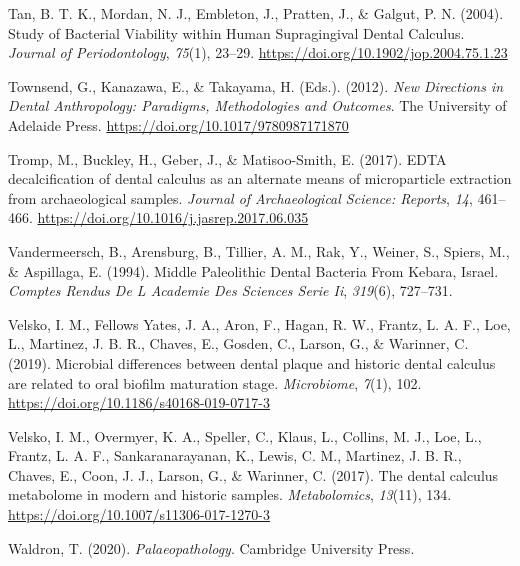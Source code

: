 \documentclass[
  b5paper,
]{book}
\newlength{\cslhangindent}
\newlength{\cslentryspacingunit} %
\newenvironment{CSLReferences}[2] %
 {%
  \setlength{\parindent}{0pt}
  \ifodd #1
  \let\oldpar\par
  \def\par{\hangindent=\cslhangindent\oldpar}
  \fi
  \setlength{\parskip}{#2\cslentryspacingunit}
 }%
 {}
\begin{document}
\begin{CSLReferences}{1}{0}
\leavevmode{}%
Tan, B. T. K., Mordan, N. J., Embleton, J., Pratten, J., \& Galgut, P.
N. (2004). Study of {Bacterial Viability} within {Human Supragingival
Dental Calculus}. \emph{Journal of Periodontology}, \emph{75}(1),
23--29. \url{https://doi.org/10.1902/jop.2004.75.1.23}

\leavevmode{}%
Townsend, G., Kanazawa, E., \& Takayama, H. (Eds.). (2012). \emph{New
{Directions} in {Dental Anthropology}: {Paradigms}, {Methodologies} and
{Outcomes}}. {The University of Adelaide Press}.
\url{https://doi.org/10.1017/9780987171870}

\leavevmode{}%
Tromp, M., Buckley, H., Geber, J., \& Matisoo-Smith, E. (2017). {EDTA}
decalcification of dental calculus as an alternate means of
microparticle extraction from archaeological samples. \emph{Journal of
Archaeological Science: Reports}, \emph{14}, 461--466.
\url{https://doi.org/10.1016/j.jasrep.2017.06.035}

\leavevmode{}%
Vandermeersch, B., Arensburg, B., Tillier, A. M., Rak, Y., Weiner, S.,
Spiers, M., \& Aspillaga, E. (1994). Middle {Paleolithic Dental Bacteria
From Kebara}, {Israel}. \emph{Comptes Rendus De L Academie Des Sciences
Serie Ii}, \emph{319}(6), 727--731.

\leavevmode{}%
Velsko, I. M., Fellows Yates, J. A., Aron, F., Hagan, R. W., Frantz, L.
A. F., Loe, L., Martinez, J. B. R., Chaves, E., Gosden, C., Larson, G.,
\& Warinner, C. (2019). Microbial differences between dental plaque and
historic dental calculus are related to oral biofilm maturation stage.
\emph{Microbiome}, \emph{7}(1), 102.
\url{https://doi.org/10.1186/s40168-019-0717-3}

\leavevmode{}%
Velsko, I. M., Overmyer, K. A., Speller, C., Klaus, L., Collins, M. J.,
Loe, L., Frantz, L. A. F., Sankaranarayanan, K., Lewis, C. M., Martinez,
J. B. R., Chaves, E., Coon, J. J., Larson, G., \& Warinner, C. (2017).
The dental calculus metabolome in modern and historic samples.
\emph{Metabolomics}, \emph{13}(11), 134.
\url{https://doi.org/10.1007/s11306-017-1270-3}

\leavevmode{}%
Waldron, T. (2020). \emph{Palaeopathology}. {Cambridge University
Press}.


\end{CSLReferences}
\end{document}

